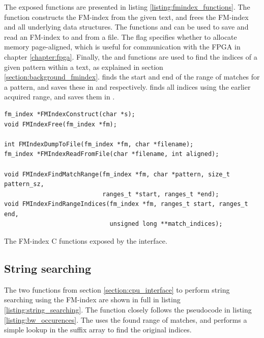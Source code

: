The exposed functions are presented in listing \ref{listing:fmindex_functions}.
The  function constructs the FM-index from the given text, and  frees the FM-index and all underlying data structures.
The functions  and  can be used to save and read an FM-index to and from a file. 
The flag  specifies whether to allocate memory page-aligned, which is useful for communication with the FPGA in chapter \ref{chapter:fpga}.
Finally, the  and  functions are used to find the indices of a given pattern within a text, as explained in section \ref{section:background_fmindex}.
 finds the start and end of the range of matches for a pattern, and saves these in  and  respectively.
 finds all indices using the earlier acquired range, and saves them in .

\begin{listing}[H]
\begin{verbatim}
fm_index *FMIndexConstruct(char *s);
void FMIndexFree(fm_index *fm);

int FMIndexDumpToFile(fm_index *fm, char *filename);
fm_index *FMIndexReadFromFile(char *filename, int aligned);

void FMIndexFindMatchRange(fm_index *fm, char *pattern, size_t pattern_sz,
                           ranges_t *start, ranges_t *end);
void FMIndexFindRangeIndices(fm_index *fm, ranges_t start, ranges_t end,
                             unsigned long **match_indices);
\end{verbatim}
\caption{The FM-index C functions exposed by the interface.}
\label{listing:fmindex_functions}
\end{listing}

\subsection{String searching} \label{section:string_searching}

The two functions from section \ref{section:cpu_interface} to perform string searching using the FM-index are shown in full in listing \ref{listing:string_searching}.
The  function closely follows the pseudocode in listing \ref{listing:bw_occurences}.
The  uses the found range of matches, and performs a simple lookup in the suffix array to find the original indices.

